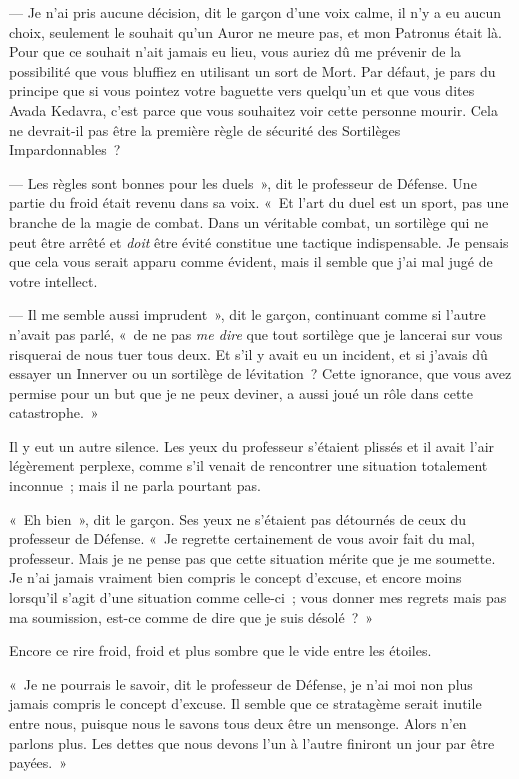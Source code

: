 --- Je n'ai pris aucune décision, dit le garçon d'une voix calme, il n'y a eu aucun choix, seulement le souhait qu'un Auror ne meure pas, et mon Patronus était là. Pour que ce souhait n'ait jamais eu lieu, vous auriez dû me prévenir de la possibilité que vous bluffiez en utilisant un sort de Mort. Par défaut, je pars du principe que si vous pointez votre baguette vers quelqu'un et que vous dites Avada Kedavra, c'est parce que vous souhaitez voir cette personne mourir. Cela ne devrait-il pas être la première règle de sécurité des Sortilèges Impardonnables~?

--- Les règles sont bonnes pour les duels~», dit le professeur de Défense. Une partie du froid était revenu dans sa voix. «~Et l'art du duel est un sport, pas une branche de la magie de combat. Dans un véritable combat, un sortilège qui ne peut être arrêté et \emph{doit} être évité constitue une tactique indispensable. Je pensais que cela vous serait apparu comme évident, mais il semble que j'ai mal jugé de votre intellect.

--- Il me semble aussi imprudent~», dit le garçon, continuant comme si l'autre n'avait pas parlé, «~de ne pas \emph{me dire} que tout sortilège que je lancerai sur vous risquerai de nous tuer tous deux. Et s'il y avait eu un incident, et si j'avais dû essayer un Innerver ou un sortilège de lévitation~? Cette ignorance, que vous avez permise pour un but que je ne peux deviner, a aussi joué un rôle dans cette catastrophe.~»

Il y eut un autre silence. Les yeux du professeur s'étaient plissés et il avait l'air légèrement perplexe, comme s'il venait de rencontrer une situation totalement inconnue~; mais il ne parla pourtant pas.

«~Eh bien~», dit le garçon. Ses yeux ne s'étaient pas détournés de ceux du professeur de Défense. «~Je regrette certainement de vous avoir fait du mal, professeur. Mais je ne pense pas que cette situation mérite que je me soumette. Je n'ai jamais vraiment bien compris le concept d'excuse, et encore moins lorsqu'il s'agit d'une situation comme celle-ci~; vous donner mes regrets mais pas ma soumission, est-ce comme de dire que je suis désolé~?~»

Encore ce rire froid, froid et plus sombre que le vide entre les étoiles.

«~Je ne pourrais le savoir, dit le professeur de Défense, je n'ai moi non plus jamais compris le concept d'excuse. Il semble que ce stratagème serait inutile entre nous, puisque nous le savons tous deux être un mensonge. Alors n'en parlons plus. Les dettes que nous devons l'un à l'autre finiront un jour par être payées.~»


